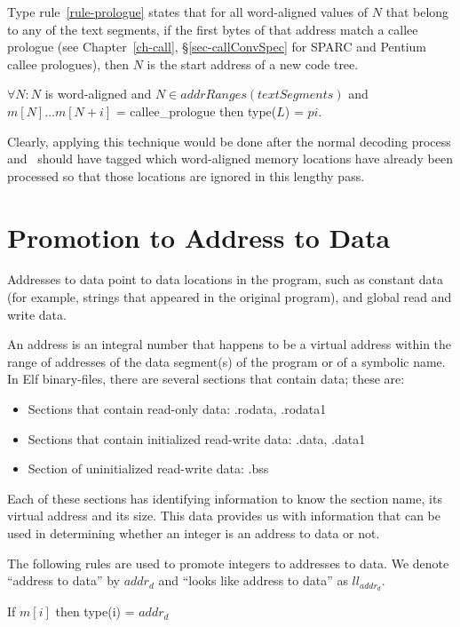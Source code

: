 Type rule~\ref{rule-prologue} states that for all word-aligned
values of $N$ that belong to any of the text segments, if 
the first bytes of that address match a callee prologue (see  
Chapter~\ref{ch-call}, \S\ref{sec-callConvSpec} for SPARC and Pentium 
callee prologues), then $N$ is the start address of a new 
code tree.  

\begin{typerule}
$\forall N: N$ is word-aligned and $N \in addrRanges(textSegments)$ 
and $m[N] \ldots m[N+i]$ = callee\_prologue then type($L$) = $pi$.
\label{rule-prologue}
\end{typerule}

Clearly, applying this technique would be done after the 
normal decoding process and \uqbt\ should have tagged which 
word-aligned memory locations have already been processed 
so that those locations are ignored in this lengthy pass. 


\iffalse
\section{Promotion to Address to Data}
Addresses to data point to data locations in the program, such as
constant data (for example, strings that appeared in the original 
program), and global read and write data. 

An address is an integral number that happens to be a virtual address 
within the range of addresses of the data segment(s) of the program or of 
a symbolic name. 
In Elf binary-files, there are several sections that contain data; 
these are: 
\begin{itemize}
\item Sections that contain read-only data: .rodata, .rodata1
\item Sections that contain initialized read-write data: .data, .data1
\item Section of uninitialized read-write data: .bss
\end{itemize}
Each of these sections has identifying information to know the 
section name, its virtual address and its size.
This data provides us with information that can be used in 
determining whether an integer is an address to data or not. 

The following rules are used to promote integers to addresses to data.
We denote ``address to data'' by $addr_d$ and ``looks like address to 
data'' as $ll_{addr_d}$. 

\begin{typerule}
If $m[i]$ then type(i) = $addr_d$
\label{rule-index}
\end{typerule}

